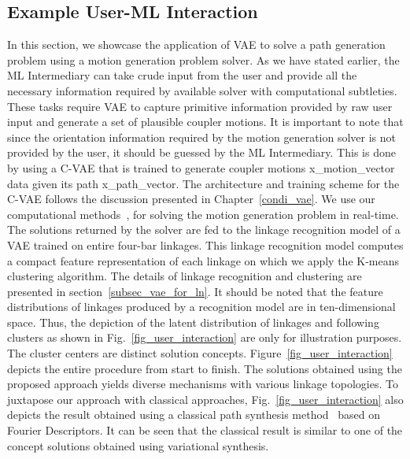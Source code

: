\subsection{Example User-ML Interaction}\label{example_interaction}
In this section, we showcase the application of VAE to solve a path generation problem using a motion generation problem solver.
As we have stated earlier, the ML Intermediary can take crude input from the user and provide all the necessary information required by available solver with computational subtleties.
These tasks require VAE to capture primitive information provided by raw user input and generate a set of plausible coupler motions.
It is important to note that since the orientation information required by the motion generation solver is not provided by the user, it should be guessed by the ML Intermediary.
This is done by using a C-VAE that is trained to generate coupler motions \ac{x_motion_vector} data given its path \ac{x_path_vector}.
The architecture and training scheme for the C-VAE follows the discussion presented in Chapter~\ref{condi_vae}.
We use our computational methods~\cite{generalfitting-JCISE},\cite{shrinathpurwar2017} for solving the motion generation problem in real-time.
The solutions returned by the solver are fed to the linkage recognition model of a VAE trained on entire four-bar linkages.
This linkage recognition model computes a compact feature representation of each linkage on which we apply the K-means\cite{lloyd1982kmeans} clustering algorithm.
The details of linkage recognition and clustering are presented in section~\ref{subsec_vae_for_ln}.
It should be noted that the feature distributions of linkages produced by a recognition model are in ten-dimensional space.
Thus, the depiction of the latent distribution of linkages and following clusters as shown in Fig.~\ref{fig_user_interaction} are only for illustration purposes.
The cluster centers are distinct solution concepts. Figure~\ref{fig_user_interaction} depicts the entire procedure from start to finish.
The solutions obtained using the proposed approach yields diverse mechanisms with various linkage topologies.
To juxtapose our approach with classical approaches, Fig.~\ref{fig_user_interaction} also depicts the result obtained using a classical path synthesis method~\cite{sharma2019optimal} based on Fourier Descriptors.
It can be seen that the classical result is similar to one of the concept solutions obtained using variational synthesis.

